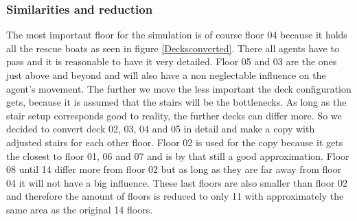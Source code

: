 \documentclass[11pt]{article}
\begin{document}
\subsubsection{Similarities and reduction}
The most important floor for the simulation is of course floor 04 because it holds all the rescue boats as seen in figure \ref{Decksconverted}. There all agents have to pass and it is reasonable to have it very detailed. Floor 05 and 03 are the ones just above and beyond and will also have a non neglectable influence on the agent’s movement.
\newline
The further we move the less important the deck configuration gets, because it is assumed that the stairs will be the bottlenecks. As long as the stair setup corresponds good to reality, the further decks can differ more.
So we decided to convert deck 02, 03, 04 and 05 in detail and make a copy with adjusted stairs for each other floor. Floor 02 is used for the copy because it gets the closest to floor 01, 06 and 07 and is by that still a good approximation.
\newline
Floor 08 until 14 differ more from floor 02 but as long as they are far away from floor 04 it will not have a big influence. These last floors are also smaller than floor 02 and therefore the amount of floors is reduced to only 11 with approximately the same area as the original 14 floors.
\end{document}
